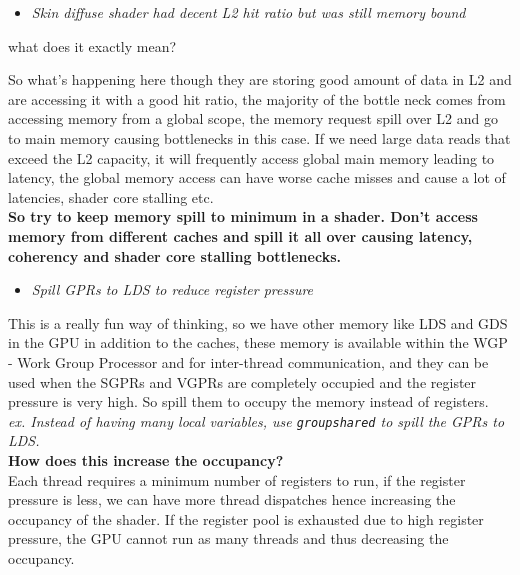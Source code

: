 \documentclass[14pt]{article}
\begin{document}

\begin{itemize}
	\item \textit{Skin diffuse shader had decent L2 hit ratio but was still memory bound}
\end{itemize}

what does it exactly mean?

So what's happening here though they are storing good amount of data in L2 and are accessing it with a good hit ratio, the majority of the bottle neck comes from accessing memory from a global scope, the memory request spill over L2 and go to main memory causing bottlenecks in this case. If we need large data reads that exceed the L2 capacity, it will frequently access global main memory leading to latency, the global memory access can have worse cache misses and cause a lot of latencies, shader core stalling etc. \\

\textbf{So try to keep memory spill to minimum in a shader. Don't access memory from different caches and spill it all over causing latency, coherency and shader core stalling bottlenecks.}


\begin{itemize}
	\item \textit{Spill GPRs to LDS to reduce register pressure}
\end{itemize}

This is a really fun way of thinking, so we have other memory like LDS and GDS in the GPU in addition to the caches, these memory is available within the WGP - Work Group Processor and for inter-thread communication, and they can be used when the SGPRs and VGPRs are completely occupied and the register pressure is very high. So spill them to occupy the memory instead of registers. \\

\textit{ex. Instead of having many local variables, use \lstinline|groupshared| to spill the GPRs to LDS.} \\

\textbf{How does this increase the occupancy?} \\
Each thread requires a minimum number of registers to run, if the register pressure is less, we can have more thread dispatches hence increasing the occupancy of the shader. If the register pool is exhausted due to high register pressure, the GPU cannot run as many threads and thus decreasing the occupancy. \\
\end{document}

